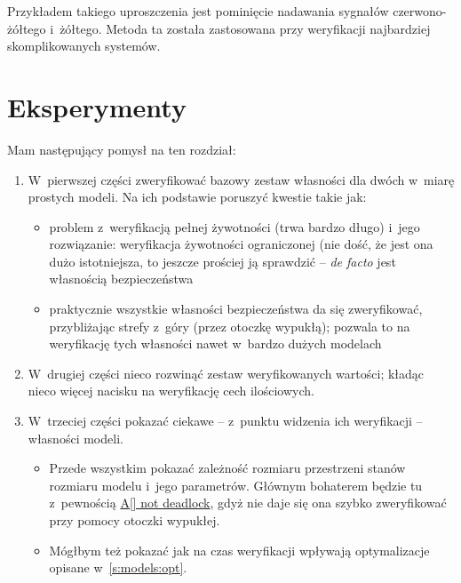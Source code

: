 \documentclass{pracamgr}
\theoremstyle{plain}
\begin{document}
Przykładem takiego uproszczenia jest pominięcie nadawania sygnałów
czerwono-żółtego i~żółtego. Metoda ta została zastosowana przy
weryfikacji najbardziej skomplikowanych systemów.

\chapter{Eksperymenty}


Mam następujący pomysł na ten rozdział:
\begin{enumerate}
  \item W~pierwszej części zweryfikować bazowy zestaw własności dla
  dwóch w~miarę prostych modeli. Na ich podstawie poruszyć kwestie
  takie jak:
  \begin{itemize}
    \item problem z~weryfikacją pełnej żywotności (trwa bardzo długo)
    i~jego rozwiązanie: weryfikacja żywotności ograniczonej (nie dość,
    że jest ona dużo istotniejsza, to jeszcze prościej ją sprawdzić --
    \emph{de facto} jest własnością bezpieczeństwa
    \item praktycznie wszystkie własności bezpieczeństwa da się
    zweryfikować, przybliżając strefy z~góry (przez otoczkę wypukłą);
    pozwala to na weryfikację tych własności nawet w~bardzo dużych
    modelach
  \end{itemize}
  \item W~drugiej części nieco rozwinąć zestaw weryfikowanych
  wartości; kładąc nieco więcej nacisku na weryfikację cech
  ilościowych.
  \item W~trzeciej części pokazać ciekawe -- z~punktu widzenia ich
  weryfikacji -- własności modeli.
  \begin{itemize}
    \item Przede wszystkim pokazać zależność rozmiaru przestrzeni
    stanów rozmiaru modelu i~jego parametrów. Głównym bohaterem będzie
    tu z~pewnością \url{A[] not deadlock}, gdyż nie daje się ona
    szybko zweryfikować przy pomocy otoczki wypukłej.
    \item Mógłbym też pokazać jak na czas weryfikacji wpływają
    optymalizacje opisane w~\ref{s:models:opt}.
  \end{itemize}
\end{enumerate}

\end{document}
